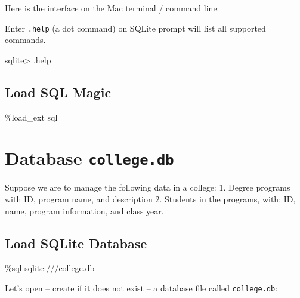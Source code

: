 \documentclass[
  letterpaper,
]{scrbook}
\newenvironment{Shaded}{\begin{snugshade}}{\end{snugshade}}
\newcommand{\NormalTok}[1]{\textcolor[rgb]{0.00,0.23,0.31}{#1}}
\newcommand{\OperatorTok}[1]{\textcolor[rgb]{0.37,0.37,0.37}{#1}}
\begin{document}
Here is the interface on the Mac terminal / command line:

Enter \texttt{.help} (a dot command) on SQLite prompt will list all
supported commands.

\begin{Shaded}
\begin{Highlighting}[]
\NormalTok{sqlite\textgreater{} .help}
\end{Highlighting}
\end{Shaded}

\subsection*{Load SQL Magic}\label{load-sql-magic}

\begin{Shaded}
\begin{Highlighting}[]
\OperatorTok{\%}\NormalTok{load\_ext sql}
\end{Highlighting}
\end{Shaded}

\section*{\texorpdfstring{Database
\texttt{college.db}}{Database college.db}}\label{database-college.db}


Suppose we are to manage the following data in a college: 1. Degree
programs with ID, program name, and description 2. Students in the
programs, with: ID, name, program information, and class year.

\subsection*{Load SQLite Database}\label{load-sqlite-database}

\begin{Shaded}
\begin{Highlighting}[]
\OperatorTok{\%}\NormalTok{sql sqlite:}\OperatorTok{///}\NormalTok{college.db}
\end{Highlighting}
\end{Shaded}

Let's open -- create if it does not exist -- a database file called
\texttt{college.db}:
\end{document}
